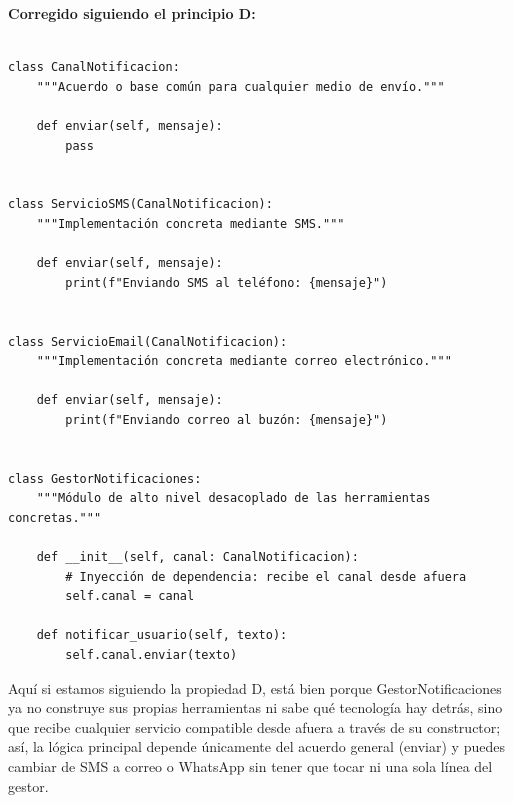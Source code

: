 \documentclass{article}
\begin{document}
        		\textbf{Corregido siguiendo el principio D:}
        		\begin{verbatim}

class CanalNotificacion:
    """Acuerdo o base común para cualquier medio de envío."""

    def enviar(self, mensaje):
        pass


class ServicioSMS(CanalNotificacion):
    """Implementación concreta mediante SMS."""

    def enviar(self, mensaje):
        print(f"Enviando SMS al teléfono: {mensaje}")


class ServicioEmail(CanalNotificacion):
    """Implementación concreta mediante correo electrónico."""

    def enviar(self, mensaje):
        print(f"Enviando correo al buzón: {mensaje}")


class GestorNotificaciones:
    """Módulo de alto nivel desacoplado de las herramientas concretas."""

    def __init__(self, canal: CanalNotificacion):
        # Inyección de dependencia: recibe el canal desde afuera
        self.canal = canal

    def notificar_usuario(self, texto):
        self.canal.enviar(texto)

        		\end{verbatim}
        			Aquí si estamos siguiendo la propiedad D, está bien porque GestorNotificaciones ya no construye sus 
					propias herramientas ni sabe qué tecnología hay detrás, sino que recibe cualquier servicio compatible desde 
					afuera a través de su constructor; así, la lógica principal depende únicamente del acuerdo general (enviar) y 
					puedes cambiar de SMS a correo o WhatsApp sin tener que tocar ni una sola línea del gestor.
\end{document}
